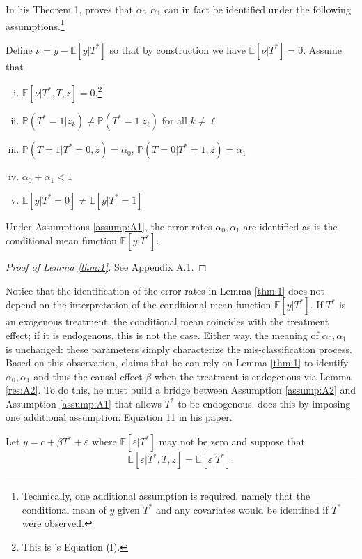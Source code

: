 In his Theorem 1, \cite{Mahajan} proves that $\alpha_0, \alpha_1$ can in fact be identified under the following assumptions.\footnote{Technically, one additional assumption is required, namely that the conditional mean of $y$ given $T^*$ and any covariates would be identified if $T^*$ were observed.}
\begin{assump}[Mahajan A1] Define $\nu = y - \mathbb{E}[y|T^*]$ so that by construction we have $\mathbb{E}[\nu|T^*]=0$. Assume that
  \label{assump:A1}
  \begin{enumerate}[(i)]
    \item $\mathbb{E}[\nu|T^*,T,z] = 0$.\footnote{This is \citeauthor{Mahajan}'s Equation (I).}
    \item $\mathbb{P}(T^*=1|z_k)\neq \mathbb{P}(T^*=1|z_\ell)$ for all $k\neq \ell$
    \item $\mathbb{P}(T = 1| T^* = 0, z) = \alpha_0$,  $\mathbb{P}(T = 0| T^* = 1, z) = \alpha_1$
    \item $\alpha_0 + \alpha_1 < 1$
    \item $\mathbb{E}[y|T^*=0]\neq \mathbb{E}[y|T^*=1]$
  \end{enumerate}
\end{assump}
\begin{lem}
  \label{thm:1}
  Under Assumptions \ref{assump:A1}, the error rates $\alpha_0, \alpha_1$ are identified as is the conditional mean function $\mathbb{E}[y|T^*]$.
\end{lem}
\begin{proof}[Proof of Lemma \ref{thm:1}]
  See \cite{Mahajan} Appendix A.1. 
\end{proof}
Notice that the identification of the error rates in Lemma \ref{thm:1} does not depend on the interpretation of the conditional mean function $\mathbb{E}[y|T^*]$.
If $T^*$ is an exogenous treatment, the conditional mean coincides with the treatment effect; if it is endogenous, this is not the case.
Either way, the meaning of $\alpha_0, \alpha_1$ is unchanged: these parameters simply characterize the mis-classification process. 
Based on this observation, \cite{Mahajan} claims that he can rely on Lemma \ref{thm:1} to identify $\alpha_0,\alpha_1$ and thus the causal effect $\beta$ when the treatment is endogenous via Lemma \ref{res:A2}.
To do this, he must build a bridge between Assumption \ref{assump:A2} and Assumption \ref{assump:A1} that allows $T^*$ to be endogenous.
\cite{Mahajan} does this by imposing one additional assumption: Equation 11 in his paper.
\begin{assump}
  \label{assump:Eq11}
  Let $y = c + \beta T^* + \varepsilon$ where $\mathbb{E}[\varepsilon|T^*]$ may not be zero and suppose that 
  \[\mathbb{E}[\varepsilon|T^*,T,z] = \mathbb{E}[\varepsilon|T^*].\]
\end{assump}
